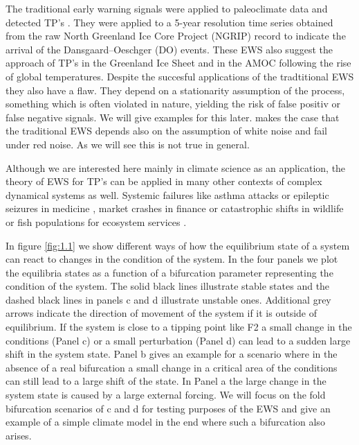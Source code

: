 \documentclass[%
thesis=student,%
coverpage=false,%
titlepage=false,%
headmarks=true, %
german,%
font=libertine, %
math=newpxtx, %
BCOR=5mm,%
coverBCOR=11mm%
]{tumbook}
\begin{document}
The traditional early warning signals were applied to paleoclimate data and detected TP's \cite{Boers:2018}. They were applied to a 5-year resolution time series obtained from the raw North Greenland Ice Core Project (NGRIP) record to indicate the arrival of the Dansgaard–Oeschger (DO) events. These EWS also suggest the approach of TP's in the Greenland Ice Sheet \cite{Boers:2021} and in the AMOC  \cite{Boers:2021b} following the rise of global temperatures. Despite the succesful applications of the tradtitional EWS they also have a flaw. They depend on a stationarity assumption of the process, something which is often violated in nature, yielding the risk of false positiv or false negative signals. We will give examples for this later. \cite{Clarke:2023} makes the case that the traditional EWS depends also on the assumption of white noise and fail under red noise. As we will see this is not true in general. 

Although we are interested here mainly in climate science as an application, the theory of EWS for TP's can be applied in many other contexts of complex dynamical systems as well. Systemic failures like asthma attacks \cite{Venegas:2005} or epileptic seizures in medicine \cite{Litt:2001, McSharry:2003}, market crashes in finance \cite{Kambhu:2007,May:2008} or catastrophic shifts in wildlife or fish populations for ecosystem services \cite{Scheffer:2001, MillenniumEcosystemAssessment:2005}. 

In figure \ref{fig:1.1} we show different ways of how the equilibrium state of a system can react to changes in the condition of the system. In the four panels we plot the equilibria states as a function of a bifurcation parameter representing the condition of the system. The solid black lines illustrate stable states and the dashed black lines in panels c and d illustrate unstable ones. Additional grey arrows indicate the direction of movement of the system if it is outside of equilibrium. If the system is close to a tipping point like F2 a small change in the conditions (Panel c) or a small perturbation (Panel d) can lead to a sudden large shift in the system state. Panel b gives an example for a scenario where in the absence of a real bifurcation a small change in a critical area of the conditions can still lead to a large shift of the state. In Panel a the large change in the system state is caused by a large external forcing. We will focus on the fold bifurcation scenarios of c and d for testing purposes of the EWS and give an example of a simple climate model in the end where such a bifurcation also arises.
\end{document}
